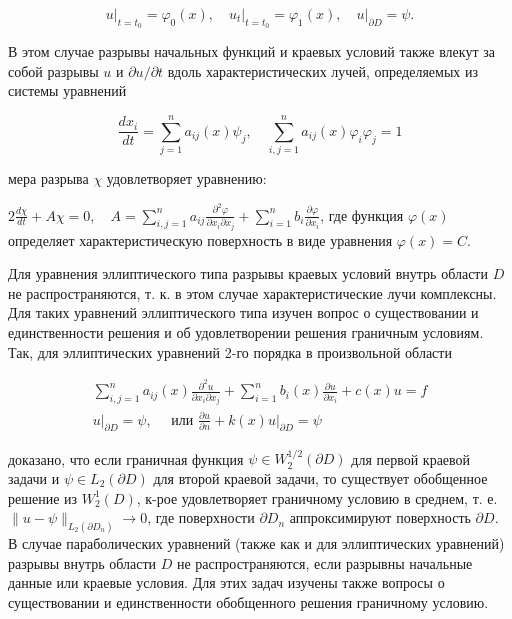 \documentclass[10pt]{article}
\begin{document}
\[

\left.u\right|_{t=t_{0}}=\varphi_{0}(x),\left.\quad u_{t}\right|_{t=t_{0}}=\varphi_{1}(x),\left.\quad u\right|_{\partial D}=\psi .

\]



В этом случае разрывы начальных функций и краевых условий также влекут за собой разрывы $u$ и $\partial u / \partial t$ вдоль характеристических лучей, определяемых из системы уравнений



\[

\frac{d x_{i}}{d t}=\sum_{j=1}^{n} a_{i j}(x) \psi_{j}, \quad \sum_{i, j=1}^{n} a_{i j}(x) \varphi_{i} \varphi_{j}=1

\]



мера разрыва $\chi$ удовлетворяет уравнению:



$2 \frac{d \chi}{d t}+A \chi=0, \quad A=\sum_{i, j=1}^{n} a_{i j} \frac{\partial^{2} \varphi}{\partial x_{i} \partial x_{j}}+\sum_{i=1}^{n} b_{i} \frac{\partial \varphi}{\partial x_{i}}$, где функция $\varphi(x)$ определяет характеристическую поверхность в виде уравнения $\varphi(x)=C$.



Для уравнения эллиптического типа разрывы краевых условий внутрь области $D$ не распространяются, т. к. в этом случае характеристические лучи комплексны. Для таких уравнений эллиптического типа изучен вопрос о существовании и единственности решения и об удовлетворении решения граничным условиям. Так, для эллиптических уравнений 2-го порядка в произвольной области



\[

\begin{gathered}

\sum_{i, j=1}^{n} a_{i j}(x) \frac{\partial^{2} u}{\partial x_{i} \partial x_{j}}+\sum_{i=1}^{n} b_{i}(x) \frac{\partial u}{\partial x_{i}}+c(x) u=f \\

\left.u\right|_{\partial D}=\psi, \quad \text { или } \frac{\partial u}{\partial n}+\left.k(x) u\right|_{\partial D}=\psi

\end{gathered}

\]



доказано, что если граничная функция $\psi \in W_{2}^{1 / 2}(\partial D)$ для первой краевой задачи и $\psi \in L_{2}(\partial D)$ для второй краевой задачи, то существует обобщенное решение из $W_{2}^{1}(D)$, к-рое удовлетворяет граничному условию в среднем, т. е. $\|u-\psi\|_{L_{2}\left(\partial D_{n}\right)} \rightarrow 0$, где поверхности $\partial D_{n}$ аппроксимируют поверхность $\partial D$. В случае параболических уравнений (также как и для эллиптических уравнений) разрывы внутрь области $D$ не распространяются, если разрывны начальные данные или краевые условия. Для этих задач изучены также вопросы о существовании и единственности обобщенного решения граничному условию.
\end{document}
